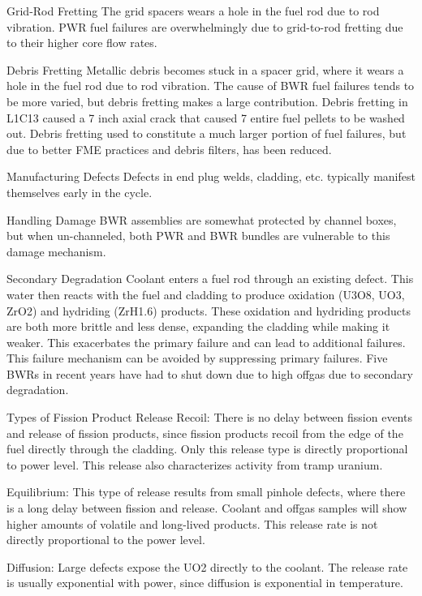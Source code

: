 \documentclass[10pt]{article}
\begin{document}
Grid-Rod Fretting
The grid spacers wears a hole in the fuel rod due to rod vibration. PWR fuel failures are overwhelmingly due to grid-to-rod fretting due to their higher core flow rates. 

Debris Fretting
Metallic debris becomes stuck in a spacer grid, where it wears a hole in the fuel rod due to rod vibration. The cause of BWR fuel failures tends to be more varied, but debris fretting makes a large contribution. Debris fretting in L1C13 caused a 7 inch axial crack that caused 7 entire fuel pellets to be washed out. Debris fretting used to constitute a much larger portion of fuel failures, but due to better FME practices and debris filters, has been reduced.

Manufacturing Defects
Defects in end plug welds, cladding, etc. typically manifest themselves early in the cycle. 

Handling Damage
BWR assemblies are somewhat protected by channel boxes, but when un-channeled, both PWR and BWR bundles are vulnerable to this damage mechanism. 

Secondary Degradation
Coolant enters a fuel rod through an existing defect. This water then reacts with the fuel and cladding to produce oxidation (U3O8, UO3, ZrO2) and hydriding (ZrH1.6) products. These oxidation and hydriding products are both more brittle and less dense, expanding the cladding while making it weaker. This exacerbates the primary failure and can lead to additional failures. This failure mechanism can be avoided by suppressing primary failures. Five BWRs in recent years have had to shut down due to high offgas due to secondary degradation.

Types of Fission Product Release
Recoil: There is no delay between fission events and release of fission products, since fission products recoil from the edge of the fuel directly through the cladding. Only this release type is directly proportional to power level. This release also characterizes activity from tramp uranium. 

Equilibrium: This type of release results from small pinhole defects, where there is a long delay between fission and release. Coolant and offgas samples will show higher amounts of volatile and long-lived products. This release rate is not directly proportional to the power level. 

Diffusion: Large defects expose the UO2 directly to the coolant. The release rate is usually exponential with power, since diffusion is exponential in temperature. 
\end{document}
